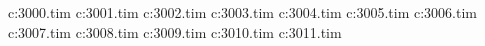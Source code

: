 c:\wipeout\textures\wtr3000.tim
c:\wipeout\textures\wtr3001.tim
c:\wipeout\textures\wtr3002.tim
c:\wipeout\textures\wtr3003.tim
c:\wipeout\textures\wtr3004.tim
c:\wipeout\textures\wtr3005.tim
c:\wipeout\textures\wtr3006.tim
c:\wipeout\textures\wtr3007.tim
c:\wipeout\textures\wtr3008.tim
c:\wipeout\textures\wtr3009.tim
c:\wipeout\textures\wtr3010.tim
c:\wipeout\textures\wtr3011.tim
